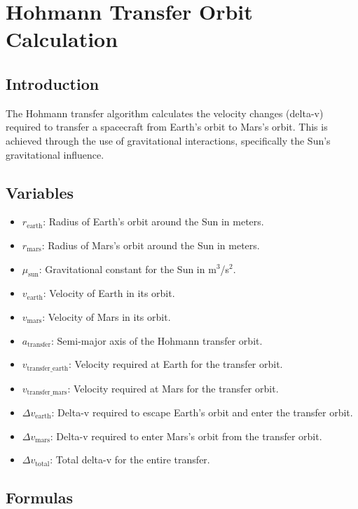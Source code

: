 \section{Hohmann Transfer Orbit Calculation}

\subsection{Introduction} 
The Hohmann transfer algorithm calculates the velocity changes (delta-v) required to transfer a spacecraft from Earth's orbit to Mars's orbit. This is achieved through the use of gravitational interactions, specifically the Sun's gravitational influence.

\subsection{Variables}

\begin{itemize}
    \item $r_{\text{earth}}$: Radius of Earth's orbit around the Sun in meters.
    \item $r_{\text{mars}}$: Radius of Mars's orbit around the Sun in meters.
    \item $\mu_{\text{sun}}$: Gravitational constant for the Sun in m$^3$/s$^2$.
    \item $v_{\text{earth}}$: Velocity of Earth in its orbit.
    \item $v_{\text{mars}}$: Velocity of Mars in its orbit.
    \item $a_{\text{transfer}}$: Semi-major axis of the Hohmann transfer orbit.
    \item $v_{\text{transfer\_earth}}$: Velocity required at Earth for the transfer orbit.
    \item $v_{\text{transfer\_mars}}$: Velocity required at Mars for the transfer orbit.
    \item $\Delta v_{\text{earth}}$: Delta-v required to escape Earth's orbit and enter the transfer orbit.
    \item $\Delta v_{\text{mars}}$: Delta-v required to enter Mars's orbit from the transfer orbit.
    \item $\Delta v_{\text{total}}$: Total delta-v for the entire transfer.
\end{itemize}

\subsection{Formulas}

